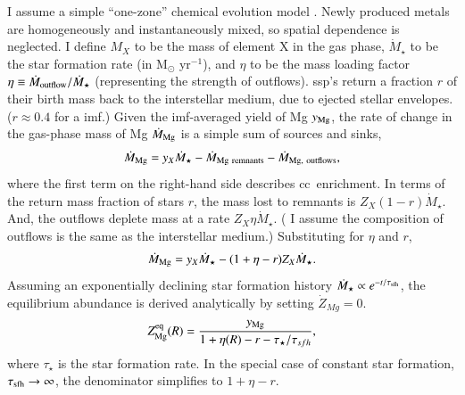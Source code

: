 \documentclass[12pt,oneside,letterpaper]{report}
\newcommand{\cc}{\gls{cc}}
\newcommand{\ssp}{\gls{ssp}}
\newcommand{\imf}{\gls{imf}}
\begin{document}
I assume a simple ``one-zone'' chemical evolution model \cite[e.g.][]{tinsley80, pagel09, matteucci21}.  Newly produced metals are homogeneously and instantaneously mixed, so spatial dependence is neglected.
I define $M_{X}$ to be the mass of element X in the gas phase, $\dot{M}_\star$ to be the star formation rate (in M$_\odot$ yr$^{-1}$), and $\eta$ to be the mass loading factor $\eta\equiv\dot{M}_{\rm outflow}/\dot{M}_\star$ (representing the strength of outflows). \ssp's return a fraction $r$ of their birth mass back to the interstellar medium, due to ejected stellar envelopes. ($r\approx0.4$ for a \citealt{kroupa01} \imf.)
Given the \imf-averaged yield of Mg $y_{\rm Mg}$, the rate of change in the gas-phase mass of Mg $\dot{M}_{\rm Mg}$ is a simple sum of sources and sinks,
\begin{equation}
    \dot{M}_{\rm Mg} =  y_{X}\dot{M}_\star - \dot{M}_{\rm Mg~remnants} - \dot{M}_{\rm Mg,~outflows},
\end{equation}
where the first term on the right-hand side describes \cc\ enrichment. 
In terms of the return mass fraction of stars $r$, the mass lost to remnants is $Z_X (1-r)\dot{M}_\star$.  And, the outflows deplete mass at a rate $Z_X \eta\dot{M}_\star$. ( I assume the composition of outflows is the same as the interstellar medium.) Substituting for $\eta$ and $r$,  
\begin{equation}
    \dot{M}_{\rm Mg}= y_{X} \dot{M}_\star - (1 + \eta - r) Z_{X} \dot{M}_\star.
\end{equation}
Assuming an exponentially declining star formation history $\dot{M}_\star \propto e^{-t/\tau_{\rm sfh}}$, the equilibrium abundance is derived analytically by setting $\dot{Z}_{Mg}=0$.
\begin{equation}\label{eq:z_eq}
    Z_{\rm Mg}^{\rm eq}(R) = \frac{y_{\rm Mg}}{1 + \eta(R) - r - \tau_\star / \tau_{sfh}},
\end{equation}
where $\tau_{\star}$ is the star formation rate.
In the special case of constant star formation, $\tau_{\rm sfh}\to\infty$, the denominator simplifies to $1+\eta-r$.
\end{document}
